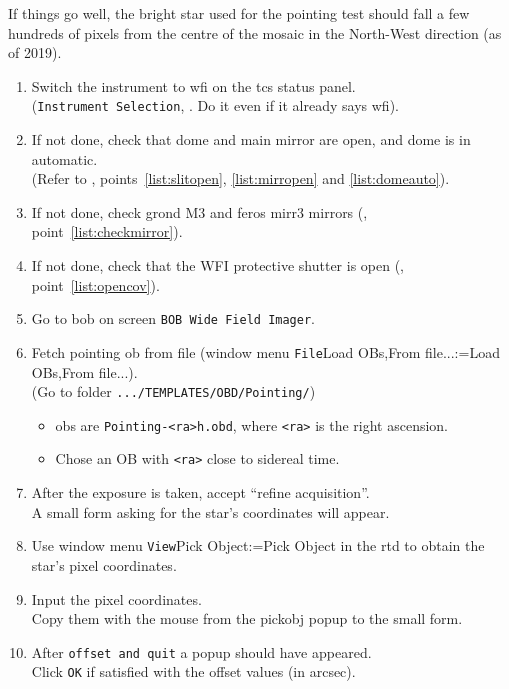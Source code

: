 \documentclass[11pt,fleqn,a4paper]{book}
\makeatletter
\def\menu#1#2{\texttt{#1}\ifx{}#2\else\@for\@x:=#2\do{$\rightarrow$\texttt{\@x}}\fi}
\def\wmenu#1#2{window menu \menu{#1}{#2}}
\def\fetchob{\wmenu{File}{Load OBs,From file...}}
\makeatother
\begin{document}
If things go well, the bright star used for the \gls{pointing} test should fall a few hundreds of pixels from the centre of the mosaic in the North-West direction (as of 2019). 
\begin{enumerate}
  \item Switch the instrument to \gls{wfi} on the \gls{tcs} status panel.\\
    (\texttt{Instrument Selection}, . Do it even if it already says \gls{wfi}).\label{list:switchwfi}
  \item If not done, check that dome and \gls{main mirror} are open, and dome is in automatic.\\
    (Refer to , points~\ref{list:slitopen}, \ref{list:mirropen} and \ref{list:domeauto}). 
  \item If not done, check \gls{grond} \gls{M3} and \gls{feros} \gls{mirr3} mirrors (, point~\ref{list:checkmirror}).
  \item If not done, check that the WFI \gls{protective shutter} is open (, point~\ref{list:opencov})\label{list:pointing:opencov}.
  \item Go to \gls{bob} on screen \texttt{BOB Wide Field Imager}.
  \item Fetch \gls{pointing} \gls{ob} from file (\fetchob).\\
        (Go to folder \texttt{.../TEMPLATES/OBD/Pointing/})
        \begin{itemize}
           \item \glspl{ob} are \texttt{Pointing-<ra>h.obd}, where \texttt{<ra>} is the right ascension.
           \item Chose an OB with \texttt{<ra>} close to sidereal time.
        \end{itemize} 
  \item After the exposure is taken, accept ``refine \gls{acquisition}''.\\
        A small form asking for the star's coordinates will appear.
  \item Use \wmenu{View}{Pick Object} in the \gls{rtd} to obtain the star's pixel coordinates.  
  \item Input the pixel coordinates.\\
        Copy them with the mouse from the \gls{pickobj} popup to the small form. 
  \item After \texttt{offset and quit} a popup should have appeared.\\
        Click \texttt{OK} if satisfied with the offset values (in arcsec).

\end{enumerate}
\end{document}
